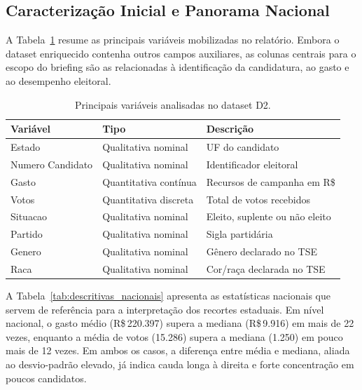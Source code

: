 \documentclass[conference]{IEEEtran}
\begin{document}
\subsection{Caracterização Inicial e Panorama Nacional}

A Tabela~\ref{tab:variaveis} resume as principais variáveis mobilizadas no
relatório. Embora o dataset enriquecido contenha outros campos auxiliares,
as colunas centrais para o escopo do briefing são as relacionadas à
identificação da candidatura, ao gasto e ao desempenho eleitoral.

\begin{table}[t]
  \centering
  \caption{Principais variáveis analisadas no dataset D2.}
  \label{tab:variaveis}
  \footnotesize
  \setlength{\tabcolsep}{4pt}
  \begin{tabular}{p{2.2cm}p{2.0cm}p{2.8cm}}
    \toprule
    \textbf{Variável} & \textbf{Tipo} & \textbf{Descrição} \\
    \midrule
    Estado & Qualitativa nominal & UF do candidato \\
    Numero Candidato & Qualitativa nominal & Identificador eleitoral \\
    Gasto & Quantitativa contínua & Recursos de campanha em R\$ \\
    Votos & Quantitativa discreta & Total de votos recebidos \\
    Situacao & Qualitativa nominal & Eleito, suplente ou não eleito \\
    Partido & Qualitativa nominal & Sigla partidária \\
    Genero & Qualitativa nominal & Gênero declarado no TSE \\
    Raca & Qualitativa nominal & Cor/raça declarada no TSE \\
    \bottomrule
  \end{tabular}
\end{table}

A Tabela~\ref{tab:descritivas_nacionais} apresenta as estatísticas nacionais
que servem de referência para a interpretação dos recortes estaduais. Em
nível nacional, o gasto médio (R\$\,220.397) supera a mediana
(R\$\,9.916) em mais de 22 vezes, enquanto a média de votos (15.286) supera
a mediana (1.250) em pouco mais de 12 vezes. Em ambos os casos, a diferença
entre média e mediana, aliada ao desvio-padrão elevado, já indica cauda
longa à direita e forte concentração em poucos candidatos.
\end{document}
